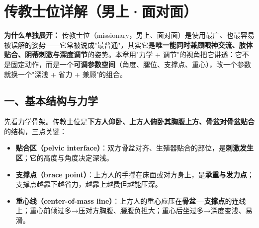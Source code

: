 \documentclass[12pt,UTF8,openany]{ctexbook}
\begin{document}
\chapter{传教士位详解（男上·面对面）}
\label{chap:missionary}

\noindent\textbf{为什么单独展开：} 传教士位（missionary，男上、面对面）是使用最广、也最容易被误解的姿势——它常被说成"最普通"，其实它是\textbf{唯一能同时兼顾眼神交流、肢体贴合、阴蒂刺激与深度调节}的姿势。本章用"力学 + 调节"的视角把它讲透：它不是固定动作，而是一个\textbf{可调参数空间}（角度、腿位、支撑点、重心），改一个参数就换一个"深浅 + 省力 + 兼顾"的组合。

\section{一、基本结构与力学}

先看力学骨架。传教士位是\textbf{下方人仰卧、上方人俯卧其胸腹上方、骨盆对骨盆贴合}的结构，三点关键：

\begin{itemize}[leftmargin=2em,itemsep=0.4em]
  \item \textbf{贴合区（pelvic interface）}：双方骨盆对齐、生殖器贴合的部位，是\textbf{刺激发生区}；它的高度与角度决定深浅。
  \item \textbf{支撑点（brace point）}：上方人的手撑在床面或对方身上，是\textbf{承重与发力点}；支撑点越靠下越省力，越靠上越费但越能压深。
  \item \textbf{重心线（center-of-mass line）}：上方人的重心应压在\textbf{骨盆—支撑点}的连线上；重心前倾过多→压对方胸腹、腰腹负担大；重心后坐过多→深度变浅、易滑。
\end{itemize}
\end{document}
